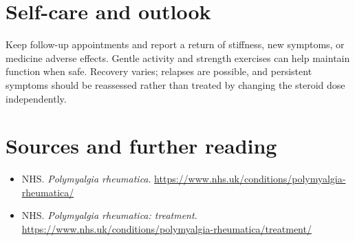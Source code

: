 \section*{Self-care and outlook}
Keep follow-up appointments and report a return of stiffness, new symptoms, or medicine adverse effects. Gentle activity and strength exercises can help maintain function when safe. Recovery varies; relapses are possible, and persistent symptoms should be reassessed rather than treated by changing the steroid dose independently.

\section*{Sources and further reading}
\begin{itemize}
\item NHS. \textit{Polymyalgia rheumatica}. \url{https://www.nhs.uk/conditions/polymyalgia-rheumatica/}
\item NHS. \textit{Polymyalgia rheumatica: treatment}. \url{https://www.nhs.uk/conditions/polymyalgia-rheumatica/treatment/}
\end{itemize}
